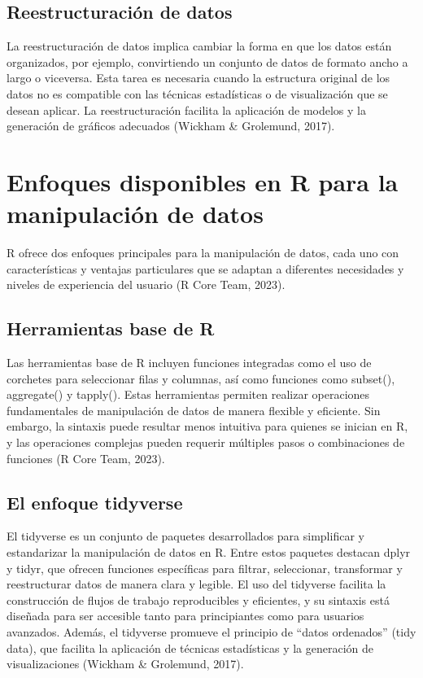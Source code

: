 \documentclass[
  spanish,
  a4paper,
  DIV=11,
  numbers=noendperiod,
  onepage,
  openany]{scrreprt}
\begin{document}
\subsection{Reestructuración de
datos}\label{reestructuraciuxf3n-de-datos}

La reestructuración de datos implica cambiar la forma en que los datos
están organizados, por ejemplo, convirtiendo un conjunto de datos de
formato ancho a largo o viceversa. Esta tarea es necesaria cuando la
estructura original de los datos no es compatible con las técnicas
estadísticas o de visualización que se desean aplicar. La
reestructuración facilita la aplicación de modelos y la generación de
gráficos adecuados (Wickham \& Grolemund, 2017).

\section{Enfoques disponibles en R para la manipulación de
datos}\label{enfoques-disponibles-en-r-para-la-manipulaciuxf3n-de-datos}

R ofrece dos enfoques principales para la manipulación de datos, cada
uno con características y ventajas particulares que se adaptan a
diferentes necesidades y niveles de experiencia del usuario (R Core
Team, 2023).

\subsection{Herramientas base de R}\label{herramientas-base-de-r}

Las herramientas base de R incluyen funciones integradas como el uso de
corchetes para seleccionar filas y columnas, así como funciones como
subset(), aggregate() y tapply(). Estas herramientas permiten realizar
operaciones fundamentales de manipulación de datos de manera flexible y
eficiente. Sin embargo, la sintaxis puede resultar menos intuitiva para
quienes se inician en R, y las operaciones complejas pueden requerir
múltiples pasos o combinaciones de funciones (R Core Team, 2023).

\subsection{El enfoque tidyverse}\label{el-enfoque-tidyverse}

El tidyverse es un conjunto de paquetes desarrollados para simplificar y
estandarizar la manipulación de datos en R. Entre estos paquetes
destacan dplyr y tidyr, que ofrecen funciones específicas para filtrar,
seleccionar, transformar y reestructurar datos de manera clara y
legible. El uso del tidyverse facilita la construcción de flujos de
trabajo reproducibles y eficientes, y su sintaxis está diseñada para ser
accesible tanto para principiantes como para usuarios avanzados. Además,
el tidyverse promueve el principio de ``datos ordenados'' (tidy data),
que facilita la aplicación de técnicas estadísticas y la generación de
visualizaciones (Wickham \& Grolemund, 2017).
\end{document}

